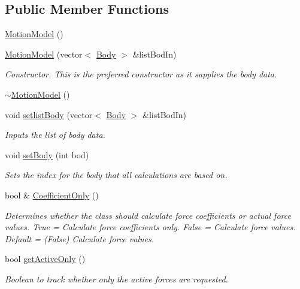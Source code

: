 \subsection*{Public Member Functions}
\begin{DoxyCompactItemize}
\item 
\hyperlink{class_motion_model_a5a5e4bba0f6ca24e1fdd316458f4f824}{Motion\-Model} ()
\item 
\hyperlink{class_motion_model_a6a790fa8f769da8e97bae08e25b6fde8}{Motion\-Model} (vector$<$ \hyperlink{class_body}{Body} $>$ \&list\-Bod\-In)
\begin{DoxyCompactList}\small\item\em Constructor. This is the preferred constructor as it supplies the body data. \end{DoxyCompactList}\item 
\hyperlink{class_motion_model_ac48a359c77d9efe39d4ec8c9e862a1cd}{$\sim$\-Motion\-Model} ()
\item 
void \hyperlink{class_motion_model_a4a62fab7349a99d8f62a8693bffd92b5}{setlist\-Body} (vector$<$ \hyperlink{class_body}{Body} $>$ \&list\-Bod\-In)
\begin{DoxyCompactList}\small\item\em Inputs the list of body data. \end{DoxyCompactList}\item 
void \hyperlink{class_motion_model_a713b903a3e78141fff2af9c045755ffb}{set\-Body} (int bod)
\begin{DoxyCompactList}\small\item\em Sets the index for the body that all calculations are based on. \end{DoxyCompactList}\item 
bool \& \hyperlink{class_motion_model_af4d34bfa133e77f1527cee1aa36b02f4}{Coefficient\-Only} ()
\begin{DoxyCompactList}\small\item\em Determines whether the class should calculate force coefficients or actual force values. True = Calculate force coefficients only. False = Calculate force values. Default = (False) Calculate force values. \end{DoxyCompactList}\item 
bool \hyperlink{class_motion_model_afc54a14912e56315505ef5dbec28bd39}{get\-Active\-Only} ()
\begin{DoxyCompactList}\small\item\em Boolean to track whether only the active forces are requested. \end{DoxyCompactList}\item 

\end{DoxyCompactItemize}
